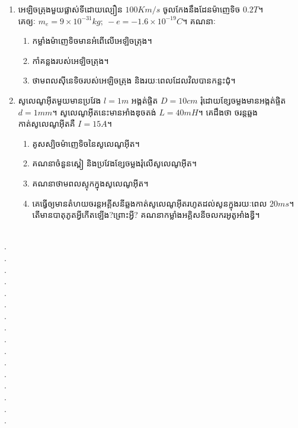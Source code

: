 \documentclass{officialexam}
\begin{document}
\begin{enumerate}[I]
\begin{multicols}{2}
	\end{multicols}
	\item អេឡិចត្រុងមួយផ្លាស់ទីដោយល្បឿន $100Km/s$ ចូលកែងនឹងដែនម៉ាញេទិច $0.2T$។\\
	គេឲ្យៈ $m_{e}=9\times10^{-31}kg;~-e=-1.6\times10^{-19}C$។ គណនាៈ
	\begin{enumerate}[k,2]
		\item កម្លាំងម៉ាញេទិចមានអំពើលើអេឡិចត្រុង។
		\item កាំគន្លងរបស់អេឡិចត្រុង។
		\item ថាមពលសុីនេទិចរបស់អេឡិចត្រុង និងរយៈពេលដែលវិលបានកន្លះជុំ។
	\end{enumerate}
	\item សូលេណូអុីតមួយមានប្រវែង $l=1m$ អង្គត់ផ្ចិត $D=10cm$ រុំដោយខ្សែចម្លងមានអង្កត់ផ្ចិត $d=1mm$។ សូលេណូអុីតនេះមានអាំងឌុចតង់ $L=40mH$។ គេដឹងថា ចរន្តឆ្លងកាត់សូលេណូអុីតគឺ $I=15A$។
	\begin{enumerate}[k]
		\item គូសស្បិចម៉ាញេទិចនៃសូលេណូអុីត។
		\item គណនាចំនួនស្ពៀ និងប្រវែងខ្សែចម្លងរុំលើសូលេណូអុីត។
		\item គណនាថាមពលស្ទុកក្នុងសូលេណូអុីត។
		\item គេធ្វើឲ្យមានតំហយចរន្តអគ្គីសនីឆ្លងកាត់សូលេណូអុីតរហូតដល់សូនក្នុងរយៈពេល $20ms$។ តើមានបាតុភូតអ្វីកើតឡើង?ព្រោះអ្វី? គណនាកម្លាំងអគ្គិសនីចលករអូតូអាំងឌ្វី។
	\end{enumerate}
\end{enumerate}
\\
{\color{white}.}\dotfill\\
{\color{white}.}\dotfill\\
{\color{white}.}\dotfill
\\
{\color{white}.}\dotfill\\
{\color{white}.}\dotfill\\
{\color{white}.}\dotfill
\\
{\color{white}.}\dotfill\\
{\color{white}.}\dotfill\\
{\color{white}.}\dotfill
\\
{\color{white}.}\dotfill\\
{\color{white}.}\dotfill\\
{\color{white}.}\dotfill
\\
{\color{white}.}\dotfill\\
{\color{white}.}\dotfill\\
{\color{white}.}\dotfill
\\
{\color{white}.}\dotfill\\
\end{document}
